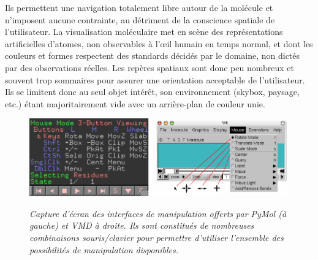 Ils permettent une navigation totalement libre autour de la molécule et n'imposent aucune contrainte, au détriment de la conscience spatiale de l'utilisateur. %
La visualisation moléculaire met en scène des représentations artificielles d'atomes, non observables à l’œil humain en temps normal, et dont les couleurs et formes respectent des standards décidés par le domaine, non dictés par des observations réelles. Les repères spatiaux sont donc peu nombreux et souvent trop sommaires pour assurer une orientation acceptable de l'utilisateur. Ils se limitent donc au seul objet intérêt, son environnement (skybox, paysage, etc.) étant majoritairement vide avec un arrière-plan de couleur unie.   
 

\begin{figure}[h]
 \centering
 {\includegraphics[width=\linewidth]{./figures/ch2/pymol_vmd_nav}}
   \caption[Captures d'écran des menus de navigation au sein de PyMol et VMD.]{\it Capture d'écran des interfaces de manipulation offerts par PyMol (à gauche) et VMD à droite. Ils sont constitués de nombreuses combinaisons souris/clavier pour permettre d'utiliser l'ensemble des possibilités de manipulation disponibles.
  }
   \label{Fig:pymol_vmd_nav}
\end{figure}



